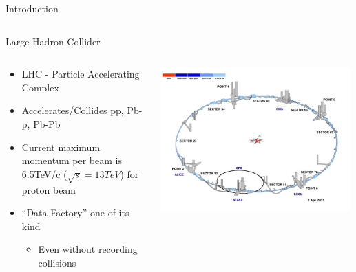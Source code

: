 \documentclass[pdf, 9pt]{beamer}
\begin{document}
\begin{frame}{Introduction}
\begin{columns}[T]
\begin{column}{0.4\textwidth}
\begin{center}
        \end{center}
      \end{column}
    \end{columns}
  \end{frame}

  \begin{frame}{Large Hadron Collider}
    \begin{columns}[T]
      \begin{column}{0.6\textwidth}
        \begin{itemize}
          \item LHC - Particle Accelerating Complex
          \item Accelerates/Collides pp, Pb-p, Pb-Pb
          \item Current maximum momentum per beam is 6.5TeV/c ($\sqrt{s}=13TeV$) for proton beam
          \item ``Data Factory'' one of its kind
            \begin{itemize}
              \item Even without recording collisions
            \end{itemize}
        \end{itemize}
      \end{column}
      \begin{column}{0.4\textwidth}
        \includegraphics[width=0.99\textwidth, height=0.55\textheight, keepaspectratio]{figs/lhc/LHC_Fig1.jpg}
      \end{column}
    \end{columns}
  \end{frame}
\end{document}
